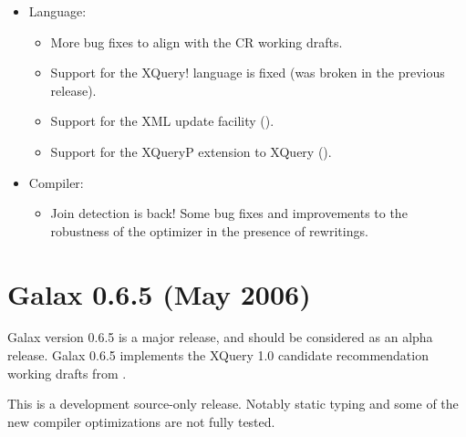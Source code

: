 \begin{itemize}
\item Language: 
  \begin{itemize}
  \item More bug fixes to align with the \xqueryversion CR working
    drafts.
  \item Support for the XQuery! language is fixed (was broken in the
    previous release).
  \item Support for the XML update facility ({\ultfurl}).
  \item Support for the XQueryP extension to XQuery ({\xqueryp}).
  \end{itemize}
\item Compiler:
  \begin{itemize}
  \item Join detection is back! Some bug fixes and improvements to the
    robustness of the optimizer in the presence of rewritings.
  \end{itemize}
\end{itemize}

\section{Galax 0.6.5 (May 2006)}

Galax version 0.6.5 is a major release, and should be considered as an
alpha release. Galax 0.6.5 implements the XQuery 1.0 candidate
recommendation working drafts from \xqueryversion.

This is a development source-only release.  Notably static typing and
some of the new compiler optimizations are not fully tested.

